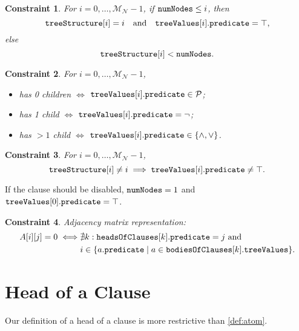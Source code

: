 \documentclass[runningheads]{llncs}
\newtheorem{constraint}{Constraint}
\newcommand{\variable}[1]{\texttt{\textup{#1}}}
\newcommand{\predicates}{\mathcal{P}}
\newcommand{\maxNumNodes}{\mathcal{M}_{\mathcal{N}}}
\begin{document}
\begin{constraint}
  For $i = 0, \dots, \maxNumNodes{} - 1$, if $\variable{numNodes} \le
  i$, then
  \[
    \variable{treeStructure}[i] = i \quad \text{and} \quad
    \variable{treeValues}[i].\variable{predicate} = \top,
  \]
  else
  \[
    \variable{treeStructure}[i] < \variable{numNodes}.
  \]
\end{constraint}

\begin{constraint}
  For $i = 0, \dots, \maxNumNodes{} - 1$,
  \begin{itemize}
  \item has 0 children $\iff$ $\variable{treeValues}[i].\variable{predicate} \in
    \predicates{}$;
  \item has 1 child $\iff$ $\variable{treeValues}[i].\variable{predicate} = \neg$;
  \item has $>1$ child $\iff$ $\variable{treeValues}[i].\variable{predicate} \in
    \{ \land, \lor \}$.
  \end{itemize}
\end{constraint}

\begin{constraint}
  For $i = 0, \dots, \maxNumNodes{} - 1$,
  \[
    \variable{treeStructure}[i] \ne i \implies
    \variable{treeValues}[i].\variable{predicate} \ne \top.
  \]
\end{constraint}

If the clause should be disabled, $\variable{numNodes} = 1$ and
$\variable{treeValues}[0].\variable{predicate} = \top$.

\begin{constraint}
  Adjacency matrix representation:
  \begin{align*}
    A[i][j] = 0 \iff &\nexists k: \variable{headsOfClauses}[k].\variable{predicate} = j \text{ and } \\
    &i \in \{ a.\variable{predicate} \mid a \in \variable{bodiesOfClauses}[k].\variable{treeValues} \}.
  \end{align*}
\end{constraint}

\section{Head of a Clause}

Our definition of a head of a clause is more restrictive than \cref{def:atom}.
\end{document}

